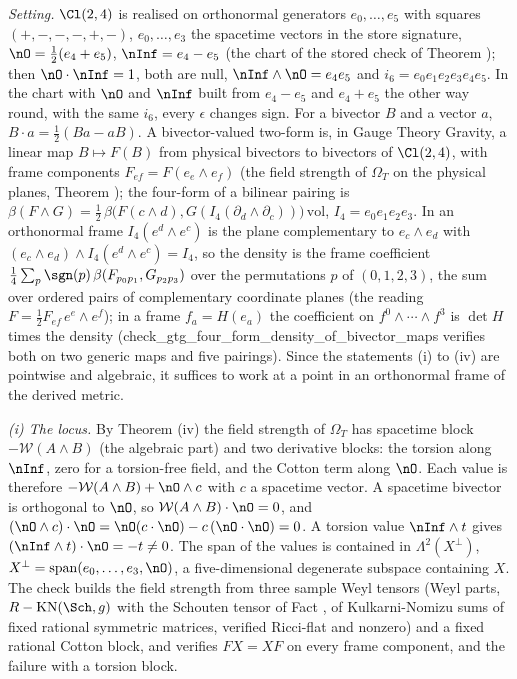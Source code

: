 \emph{Setting.} $\Cl(2,4)$ is realised on orthonormal generators $e_{0}, \dots, e_{5}$ with squares $(+,-,-,-,+,-)$, $e_{0}, \dots, e_{3}$ the spacetime vectors in the store signature, $\nO = \tfrac12(e_{4} + e_{5})$, $\nInf = e_{4} - e_{5}$ (the chart of the stored check of Theorem ); then $\nO \cdot \nInf = 1$, both are null, $\nInf \wedge \nO = e_{4}e_{5}$ and $i_{6} = e_{0}e_{1}e_{2}e_{3}e_{4}e_{5}$. In the chart with $\nO$ and $\nInf$ built from $e_{4} - e_{5}$ and $e_{4} + e_{5}$ the other way round, with the same $i_{6}$, every $\epsilon$ changes sign. For a bivector $B$ and a vector $a$, $B \cdot a = \tfrac12(Ba - aB)$. A bivector-valued two-form is, in Gauge Theory Gravity, a linear map $B \mapsto F(B)$ from physical bivectors to bivectors of $\Cl(2,4)$, with frame components $F_{ef} = F(e_{e}\wedge e_{f})$ (the field strength of $\Omega_{T}$ on the physical planes, Theorem ); the four-form of a bilinear pairing is $\beta(F \wedge G) = \tfrac12\,\beta\bigl(F(c \wedge d), G(I_{4}(\partial_{d} \wedge \partial_{c}))\bigr)\,\mathrm{vol}$, $I_{4} = e_{0}e_{1}e_{2}e_{3}$. In an orthonormal frame $I_{4}(e^{d} \wedge e^{c})$ is the plane complementary to $e_{c} \wedge e_{d}$ with $(e_{c} \wedge e_{d}) \wedge I_{4}(e^{d} \wedge e^{c}) = I_{4}$, so the density is the frame coefficient $\tfrac14\sum_{p}\sgn(p)\,\beta(F_{p_{0}p_{1}}, G_{p_{2}p_{3}})$ over the permutations $p$ of $(0,1,2,3)$, the sum over ordered pairs of complementary coordinate planes (the reading $F = \tfrac12 F_{ef}\,e^{e} \wedge e^{f}$); in a frame $f_{a} = H(e_{a})$ the coefficient on $f^{0} \wedge \cdots \wedge f^{3}$ is $\det H$ times the density (check\_gtg\_four\_form\_density\_of\_bivector\_maps verifies both on two generic maps and five pairings). Since the statements (i) to (iv) are pointwise and algebraic, it suffices to work at a point in an orthonormal frame of the derived metric.

\emph{(i) The locus.} By Theorem (iv) the field strength of $\Omega_{T}$ has spacetime block $-\mathcal{W}(A \wedge B)$ (the algebraic part) and two derivative blocks: the torsion along $\nInf$, zero for a torsion-free field, and the Cotton term along $\nO$. Each value is therefore $-\mathcal{W}(A \wedge B) + \nO \wedge c$ with $c$ a spacetime vector. A spacetime bivector is orthogonal to $\nO$, so $\mathcal{W}(A \wedge B)\cdot\nO = 0$, and $(\nO \wedge c)\cdot\nO = \nO(c \cdot \nO) - c\,(\nO \cdot \nO) = 0$. A torsion value $\nInf \wedge t$ gives $(\nInf \wedge t)\cdot\nO = -t \neq 0$. The span of the values is contained in $\Lambda^{2}(X^{\perp})$, $X^{\perp} = \mathrm{span}(e_{0}, \dots, e_{3}, \nO)$, a five-dimensional degenerate subspace containing $X$. The check builds the field strength from three sample Weyl tensors (Weyl parts, $R - \mathrm{KN}(\Sch, g)$ with the Schouten tensor of Fact , of Kulkarni-Nomizu sums of fixed rational symmetric matrices, verified Ricci-flat and nonzero) and a fixed rational Cotton block, and verifies $FX = XF$ on every frame component, and the failure with a torsion block.

